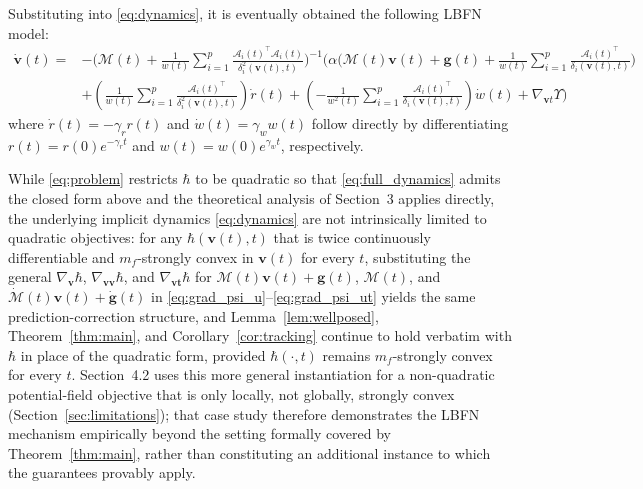 \documentclass[fleqn,10pt]{wlscirep}
\begin{document}
Substituting into \eqref{eq:dynamics}, it is eventually obtained the following LBFN model:
\begin{equation}
\begin{aligned}
\dot{\bm{v}}(t)=  &-\bigg( \mathcal{M}(t) + \frac{1}{w(t)} \sum_{i=1}^{p} \frac{\mathcal{A}_i(t)^\top \mathcal{A}_i(t)}{\delta_i^2(\bm{v}(t), t)} \bigg)^{-1} \bigg( \alpha \bigg( \mathcal{M}(t) \bm{v}(t)+ \bm{g}(t)+ \frac{1}{w(t)} \sum_{i=1}^{p} \frac{\mathcal{A}_i(t)^\top}{\delta_i(\bm{v}(t), t)} \bigg) \\
&+ \left( \frac{1}{w(t)} \sum_{i=1}^{p} \frac{\mathcal{A}_i(t)^\top}{\delta_i^2(\bm{v}(t), t)} \right) \dot{r}(t)+ \left( -\frac{1}{w^2(t)} \sum_{i=1}^{p} \frac{\mathcal{A}_i(t)^\top}{\delta_i(\bm{v}(t), t)} \right) \dot{w}(t) + \nabla_{\bm{v} t} \Upsilon \bigg)
\end{aligned}
\label{eq:full_dynamics}
\end{equation}
where $\dot{r}(t)=-\gamma_r r(t)$ and $\dot{w}(t)=\gamma_w w(t)$ follow directly by differentiating $r(t)=r(0)e^{-\gamma_r t}$ and $w(t)=w(0)e^{\gamma_w t}$, respectively.

While \eqref{eq:problem} restricts $\hbar$ to be quadratic so that \eqref{eq:full_dynamics} admits the closed form above and the theoretical analysis of Section~3 applies directly, the underlying implicit dynamics \eqref{eq:dynamics} are not intrinsically limited to quadratic objectives: for any $\hbar(\bm{v}(t),t)$ that is twice continuously differentiable and $m_f$-strongly convex in $\bm{v}(t)$ for every $t$, substituting the general $\nabla_{\bm{v}}\hbar$, $\nabla_{\bm{vv}}\hbar$, and $\nabla_{\bm{vt}}\hbar$ for $\mathcal{M}(t)\bm{v}(t)+\bm{g}(t)$, $\mathcal{M}(t)$, and $\dot{\mathcal{M}}(t)\bm{v}(t)+\dot{\bm{g}}(t)$ in \eqref{eq:grad_psi_u}--\eqref{eq:grad_psi_ut} yields the same prediction-correction structure, and Lemma~\ref{lem:wellposed}, Theorem~\ref{thm:main}, and Corollary~\ref{cor:tracking} continue to hold verbatim with $\hbar$ in place of the quadratic form, provided $\hbar(\cdot,t)$ remains $m_f$-strongly convex for every $t$. Section~4.2 uses this more general instantiation for a non-quadratic potential-field objective that is only locally, not globally, strongly convex (Section~\ref{sec:limitations}); that case study therefore demonstrates the LBFN mechanism empirically beyond the setting formally covered by Theorem~\ref{thm:main}, rather than constituting an additional instance to which the guarantees provably apply.
\end{document}
